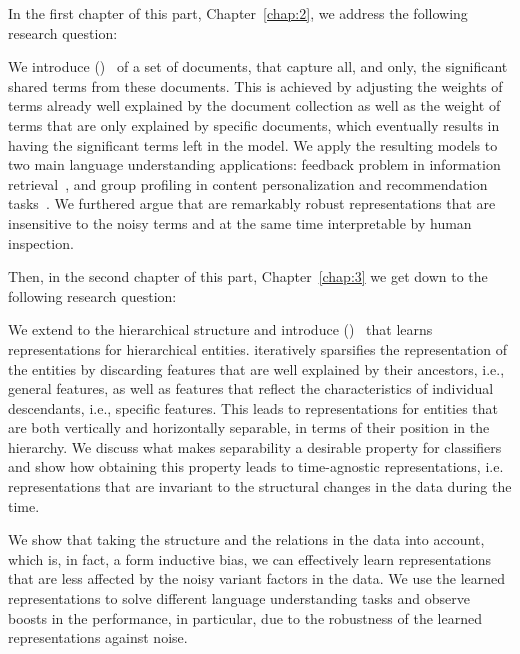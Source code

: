 In the first chapter of this part, Chapter~\ref{chap:2}, we address the following research question:

We introduce \emph{\swlms} (\acswlm)~\citep{Dehghani:2016:SIGIR} of a set of documents, that capture all, and only, the significant shared terms from these documents.  This is achieved by adjusting the weights of terms already well explained by the document collection as well as the weight of terms that are only explained by specific documents, which eventually results in having the significant terms left in the model. 
We apply the resulting models to two main language understanding applications: feedback problem in information retrieval~\citep{Dehghani:CIKM2016:long, Dehghani:CIKM2016:short}, and group profiling in content personalization and recommendation tasks~\citep{Dehghani:2016:CHIIR,Dehghani2016:trec}. We furthered argue that \acswlm are remarkably robust representations that are insensitive to the noisy terms and at the same time interpretable by human inspection. 

Then, in the second chapter of this part, Chapter~\ref{chap:3} we get down to the following research question:

We extend \emph{\swlms} to the hierarchical structure and introduce \emph{\hswlms} (\achswlm)~\citep{Dehghani:2016:ICTIR, Dehghani:2016:CLEF} that learns representations for hierarchical entities. \achswlm iteratively sparsifies the representation of the entities by discarding features that are well explained by their ancestors, i.e., general features, as well as features that reflect the characteristics of individual descendants, i.e., specific features. This leads to representations for entities that are both vertically and horizontally separable, in terms of their position in the hierarchy. We discuss what makes separability a desirable property for classifiers and show how obtaining this property leads to time-agnostic representations, i.e. representations that are invariant to the structural changes in the data during the time.

\medskip
We show that taking the structure and the relations in the data into account, which is, in fact, a form inductive bias, we can effectively learn representations that are less affected by the noisy variant factors in the data. We use the learned representations to solve different language understanding tasks and observe boosts in the performance, in particular, due to the robustness of the learned representations against noise.


